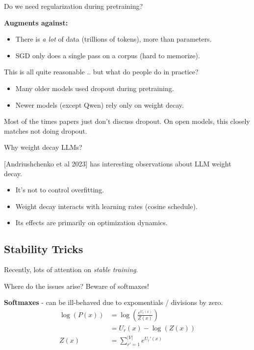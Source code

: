 \documentclass[12pt,twoside]{article}
\begin{document}
\begin{question}
    Do we need regularization during pretraining?
\end{question}

\textbf{Augments against:}

\begin{itemize}
    \item There is \textit{a lot} of data (trillions of tokens), more than parameters.
    \item SGD only does a single pass on a corpus (hard to memorize). 
\end{itemize}

This is all quite reasonable .. but what do people do in practice?

\begin{itemize}
    \item Many older models used dropout during pretraining.
    \item Newer models (except Qwen) rely only on weight decay. 
\end{itemize}

Most of the times papers just don't discuss dropout. On open models, this closely matches not doing dropout.

\begin{question}
    Why weight decay LLMs?
\end{question}

[Andriushchenko et al 2023] has interesting observations about LLM weight decay.

\begin{itemize}
    \item It's not to control overfitting.
    \item Weight decay interacts with learning rates (cosine schedule).
    \item Its effects are primarily on optimization dynamics. 
\end{itemize}

\subsection*{Stability Tricks}

Recently, lots of attention on \textit{stable training}.

\begin{center}
    Where do the issues arise? Beware of softmaxes! 
\end{center}

\textbf{Softmaxes} - can be ill-behaved due to expomentials / divisions by zero.
\begin{align*}
    \log(P(x)) &= \log\left(\frac{e^{U_r(x)}}{Z(x)}\right) \\
    &= U_r(x) - \log(Z(x)) \\
    Z(x) &= \sum_{r' = 1}^{\vert V \vert} e^{U_r'(x)}
\end{align*}
\end{document}
